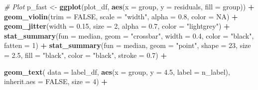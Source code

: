 \documentclass[
]{article}
\newenvironment{Shaded}{\begin{snugshade}}{\end{snugshade}}
\newcommand{\AttributeTok}[1]{\textcolor[rgb]{0.13,0.29,0.53}{#1}}
\newcommand{\CommentTok}[1]{\textcolor[rgb]{0.56,0.35,0.01}{\textit{#1}}}
\newcommand{\ConstantTok}[1]{\textcolor[rgb]{0.56,0.35,0.01}{#1}}
\newcommand{\DecValTok}[1]{\textcolor[rgb]{0.00,0.00,0.81}{#1}}
\newcommand{\FloatTok}[1]{\textcolor[rgb]{0.00,0.00,0.81}{#1}}
\newcommand{\FunctionTok}[1]{\textcolor[rgb]{0.13,0.29,0.53}{\textbf{#1}}}
\newcommand{\NormalTok}[1]{#1}
\newcommand{\OtherTok}[1]{\textcolor[rgb]{0.56,0.35,0.01}{#1}}
\newcommand{\SpecialCharTok}[1]{\textcolor[rgb]{0.81,0.36,0.00}{\textbf{#1}}}
\newcommand{\StringTok}[1]{\textcolor[rgb]{0.31,0.60,0.02}{#1}}
\begin{document}
\begin{Shaded}
\begin{Highlighting}[]
\CommentTok{\# Plot}
\NormalTok{p\_fast }\OtherTok{\textless{}{-}} \FunctionTok{ggplot}\NormalTok{(plot\_df, }\FunctionTok{aes}\NormalTok{(}\AttributeTok{x =}\NormalTok{ group, }\AttributeTok{y =}\NormalTok{ residuals, }\AttributeTok{fill =}\NormalTok{ group)) }\SpecialCharTok{+}
  \FunctionTok{geom\_violin}\NormalTok{(}\AttributeTok{trim =} \ConstantTok{FALSE}\NormalTok{, }\AttributeTok{scale =} \StringTok{"width"}\NormalTok{, }\AttributeTok{alpha =} \FloatTok{0.8}\NormalTok{, }\AttributeTok{color =} \ConstantTok{NA}\NormalTok{) }\SpecialCharTok{+}
  \FunctionTok{geom\_jitter}\NormalTok{(}\AttributeTok{width =} \FloatTok{0.15}\NormalTok{, }\AttributeTok{size =} \DecValTok{2}\NormalTok{, }\AttributeTok{alpha =} \FloatTok{0.7}\NormalTok{, }\AttributeTok{color =} \StringTok{"lightgrey"}\NormalTok{) }\SpecialCharTok{+}
    \FunctionTok{stat\_summary}\NormalTok{(}\AttributeTok{fun =}\NormalTok{ median, }\AttributeTok{geom =} \StringTok{"crossbar"}\NormalTok{, }\AttributeTok{width =} \FloatTok{0.4}\NormalTok{, }\AttributeTok{color =} \StringTok{"black"}\NormalTok{, }\AttributeTok{fatten =} \DecValTok{1}\NormalTok{) }\SpecialCharTok{+}
  \FunctionTok{stat\_summary}\NormalTok{(}\AttributeTok{fun =}\NormalTok{ median, }\AttributeTok{geom =} \StringTok{"point"}\NormalTok{, }\AttributeTok{shape =} \DecValTok{23}\NormalTok{, }\AttributeTok{size =} \FloatTok{2.5}\NormalTok{,}
               \AttributeTok{fill =} \StringTok{"black"}\NormalTok{, }\AttributeTok{color =} \StringTok{"black"}\NormalTok{, }\AttributeTok{stroke =} \FloatTok{0.7}\NormalTok{) }\SpecialCharTok{+}

 \FunctionTok{geom\_text}\NormalTok{(}
  \AttributeTok{data =}\NormalTok{ label\_df,}
  \FunctionTok{aes}\NormalTok{(}\AttributeTok{x =}\NormalTok{ group, }\AttributeTok{y =} \FloatTok{4.5}\NormalTok{, }\AttributeTok{label =}\NormalTok{ n\_label),}
  \AttributeTok{inherit.aes =} \ConstantTok{FALSE}\NormalTok{,}
  \AttributeTok{size =} \DecValTok{4}\NormalTok{) }\SpecialCharTok{+}


\end{Highlighting}
\end{Shaded}
\end{document}
